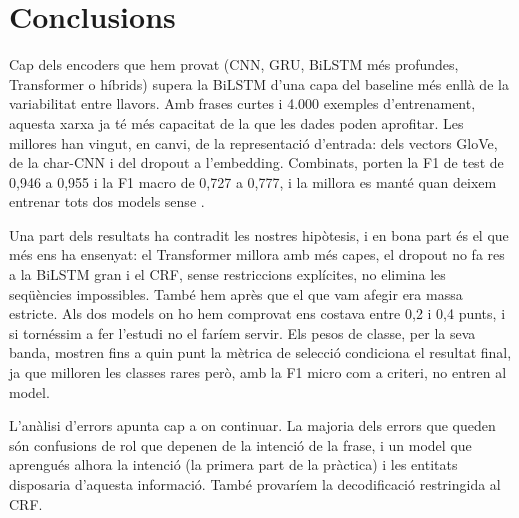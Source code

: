 \section{Conclusions}
\label{sec:conclusions}

Cap dels encoders que hem provat (CNN, GRU, BiLSTM més profundes, Transformer o híbrids) supera la BiLSTM d'una
capa del baseline més enllà de la variabilitat entre llavors. Amb frases curtes i 4.000 exemples d'entrenament,
aquesta xarxa ja té més capacitat de la que les dades poden aprofitar. Les millores han vingut, en canvi, de la
representació d'entrada: dels vectors GloVe, de la char-CNN i del dropout a l'embedding. Combinats, porten la F1 de
test de 0,946 a 0,955 i la F1 macro de 0,727 a 0,777, i la millora es manté quan deixem entrenar tots dos models
sense \mindelta.

Una part dels resultats ha contradit les nostres hipòtesis, i en bona part és el que més ens ha ensenyat: el
Transformer millora amb més capes, el dropout no fa res a la BiLSTM gran i el CRF, sense restriccions explícites,
no elimina les seqüències impossibles. També hem après que el \mindelta{} que vam afegir era massa estricte. Als
dos models on ho hem comprovat ens costava entre 0,2 i 0,4 punts, i si tornéssim a fer l'estudi no el faríem
servir. Els pesos de classe, per la seva banda, mostren fins a quin punt la mètrica de selecció condiciona el
resultat final, ja que milloren les classes rares però, amb la F1 micro com a criteri, no entren al model.

L'anàlisi d'errors apunta cap a on continuar. La majoria dels errors que queden són confusions de rol que depenen
de la intenció de la frase, i un model que aprengués alhora la intenció (la primera part de la pràctica) i les
entitats disposaria d'aquesta informació. També provaríem la decodificació restringida al CRF.
